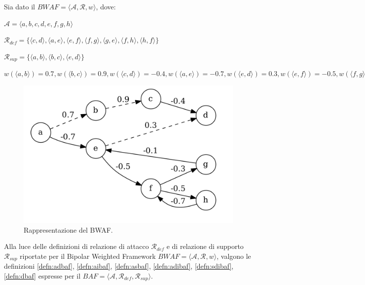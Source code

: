 \bigskip
\begin{exmp}
    Sia dato il $BWAF  = ⟨\mathcal{A}, \mathcal{R}, w⟩$, dove:
    \begin{center}
        $\mathcal{A} = ⟨a, b, c, d, e, f, g, h⟩$
        
        $\mathcal{R}_{def} = \{⟨c, d⟩, ⟨a, e⟩, ⟨e, f⟩, ⟨f, g⟩, ⟨g, e⟩, ⟨f, h⟩, ⟨h, f⟩\}$
        
        $\mathcal{R}_{sup} = \{⟨a, b⟩, ⟨b, c⟩, ⟨e, d⟩\}$
        
        $w(⟨a, b⟩) = 0.7, w(⟨b, c⟩) = 0.9, w(⟨c, d⟩) = -0.4, w(⟨a, e⟩) = -0.7, w(⟨e, d⟩) = 0.3, w(⟨e, f⟩) = -0.5, w(⟨f, g⟩) = -0.3, w(⟨g, e⟩) = -0.1, w(⟨f, h⟩) = -0.5, w(⟨h, f⟩) = -0.7$
    \end{center}
    
    \begin{figure}[h]
      \includegraphics[width=\linewidth]{Immagini/example-bwaf-graph.png}
      \caption{Rappresentazione del BWAF.}
      \label{fig:bwaf-graph1}
    \end{figure}
    
    \label{exm:bwaf}
\end{exmp}

Alla luce delle definizioni di relazione di attacco $\mathcal{R}_{def}$ e di relazione di supporto $\mathcal{R}_{sup}$ riportate per il Bipolar Weighted Framework $BWAF = ⟨\mathcal{A}, \mathcal{R}, w⟩$, valgono le definizioni \ref{defn:adbaf}, \ref{defn:aibaf}, \ref{defn:asbaf}, \ref{defn:adibaf}, \ref{defn:sdibaf}, \ref{defn:dbaf} espresse per il $BAF = ⟨\mathcal{A}, \mathcal{R}_{def}, \mathcal{R}_{sup}⟩$.


